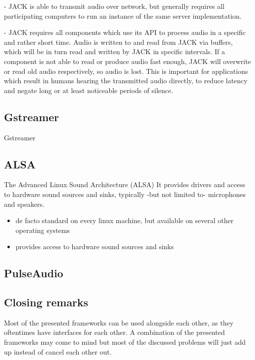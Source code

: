 - JACK is able to transmit audio over network, but generally requires all participating computers to run an instance of the same server implementation. 

- JACK requires all components which use its API to process audio in a specific and rather short time. 
Audio is written to and read from JACK via buffers, which will be in turn read and written by JACK in specific intervals.
If a component is not able to read or produce audio fast enough, JACK will overwrite or read old audio respectively, so audio is lost. 
This is important for applications which result in humans hearing the transmitted audio directly, to reduce latency and negate long or at least noticeable periods of silence.

\subsection{Gstreamer}

Gstreamer \cite{Gstreamer}

\subsection{ALSA}
The Advanced Linux Sound Architecture (ALSA) 
It provides drivers and access to hardware sound sources and sinks, typically -but not limited to- microphones and speakers.

\begin{itemize}
	\item de facto standard on every linux machine, but available on several other operating systems
	\item provides access to hardware sound sources and sinks
\end{itemize}

\subsection{PulseAudio}

\subsection{Closing remarks}
Most of the presented frameworks can be used alongside each other, as they oftentimes have interfaces for each other. 
A combination of the presented frameworks may come to mind but most of the discussed problems will just add up instead of cancel each other out.
